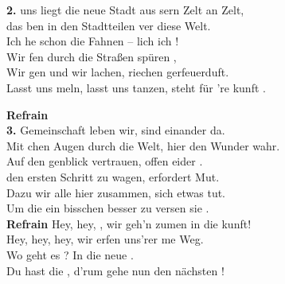 

\noindent\textbf{2.}  uns liegt die neue Stadt aus sern Zelt an Zelt,\\
das ben in den Stadtteilen ver diese Welt.\\
Ich he schon die Fahnen – lich  ich !\\
Wir fen durch die Straßen spüren ,\\
Wir gen und wir lachen, riechen gerfeuerduft.\\
Lasst uns meln, lasst uns tanzen, steht für 're kunft .\\[0.5em]

\pagebreak

\noindent\textbf{Refrain}\\

\noindent\textbf{3.}  Gemeinschaft leben wir, sind einander da.\\
Mit chen Augen durch die Welt, hier den Wunder wahr.\\
Auf den genblick vertrauen, offen eider .\\
 den ersten Schritt zu wagen,  erfordert Mut.\\
Dazu  wir alle hier zusammen,  sich etwas tut.\\
Um die  ein bisschen besser zu versen  sie .\\[0.5em]

\noindent\textbf{Refrain} Hey, hey, , wir geh'n zumen in die kunft!\\
Hey, hey, hey, wir erfen uns'rer me Weg.\\
Wo geht es ? In die neue .\\
Du hast die , d'rum gehe nun den nächsten !\\
